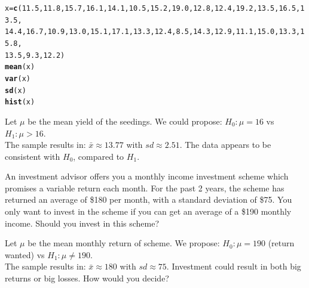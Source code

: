\documentclass[bigtut]{tutorial}\usepackage[]{graphicx}\usepackage[]{color}
\makeatletter
\newcommand{\hlnum}[1]{\textcolor[rgb]{0.686,0.059,0.569}{#1}}%
\newcommand{\hlstd}[1]{\textcolor[rgb]{0.345,0.345,0.345}{#1}}%
\newcommand{\hlkwb}[1]{\textcolor[rgb]{0.69,0.353,0.396}{#1}}%
\newcommand{\hlkwd}[1]{\textcolor[rgb]{0.737,0.353,0.396}{\textbf{#1}}}%
\newenvironment{kframe}{%
 \def\at@end@of@kframe{}%
 \ifinner\ifhmode%
  \def\at@end@of@kframe{\end{minipage}}%
  \begin{minipage}{\columnwidth}%
 \fi\fi%
 \def\FrameCommand##1{\hskip\@totalleftmargin \hskip-\fboxsep
 \colorbox{shadecolor}{##1}\hskip-\fboxsep
     \hskip-\linewidth \hskip-\@totalleftmargin \hskip\columnwidth}%
 \MakeFramed {\advance\hsize-\width
   \@totalleftmargin\z@ \linewidth\hsize
   \@setminipage}}%
 {\par\unskip\endMakeFramed%
 \at@end@of@kframe}
\newenvironment{knitrout}{}{} %
\makeatother
\begin{document}
\begin{tutorial}
\begin{questions}
\begin{knitrout}
\color{fgcolor}\begin{kframe}
\begin{alltt}
\hlstd{x}\hlkwb{=}\hlkwd{c}\hlstd{(}\hlnum{11.5}\hlstd{,}\hlnum{11.8}\hlstd{,}\hlnum{15.7}\hlstd{,}\hlnum{16.1}\hlstd{,}\hlnum{14.1}\hlstd{,}\hlnum{10.5}\hlstd{,}\hlnum{15.2}\hlstd{,}\hlnum{19.0}\hlstd{,}\hlnum{12.8}\hlstd{,}\hlnum{12.4}\hlstd{,}\hlnum{19.2}\hlstd{,}\hlnum{13.5}\hlstd{,}\hlnum{16.5}\hlstd{,}\hlnum{13.5}\hlstd{,}
      \hlnum{14.4}\hlstd{,}\hlnum{16.7}\hlstd{,}\hlnum{10.9}\hlstd{,}\hlnum{13.0}\hlstd{,}\hlnum{15.1}\hlstd{,}\hlnum{17.1}\hlstd{,}\hlnum{13.3}\hlstd{,}\hlnum{12.4}\hlstd{,}\hlnum{8.5}\hlstd{,}\hlnum{14.3}\hlstd{,}\hlnum{12.9}\hlstd{,}\hlnum{11.1}\hlstd{,}\hlnum{15.0}\hlstd{,}\hlnum{13.3}\hlstd{,}\hlnum{15.8}\hlstd{,}
      \hlnum{13.5}\hlstd{,}\hlnum{9.3}\hlstd{,}\hlnum{12.2}\hlstd{)}
\hlkwd{mean}\hlstd{(x)}
\hlkwd{var}\hlstd{(x)}
\hlkwd{sd}\hlstd{(x)}
\hlkwd{hist}\hlstd{(x)}
\end{alltt}
\end{kframe}
\end{knitrout}

\begin{solution}

Let $\mu$ be the mean yield of the seedings.
We could propose: $H_{0}: \mu = 16$ vs $H_{1}: \mu > 16$. \\

The sample results in:  $\bar{x} \approx 13.77$ with $sd \approx 2.51$.
The data appears to be consistent with $H_{0}$, compared to $H_{1}$.
\end{solution}

\question
An investment advisor offers you a monthly income investment scheme which promises a variable return each month. 
For the past  2 years, the scheme has returned an average of \$180 per month, with a  standard deviation of \$75.
You only want to invest in the scheme if you can get an average of a \$190 monthly income. Should you invest in this scheme?

\begin{solution}
Let $\mu$ be the mean monthly return of scheme.
We propose: $H_{0}: \mu = 190$ (return wanted) vs $H_{1}: \mu \neq 190$. \\

The sample results in:  $\bar{x} \approx 180$ with $sd \approx 75$.  Investment could result in both big returns or big losses. How would you decide?


\end{solution}
\end{questions}
\end{tutorial}
\end{document}
